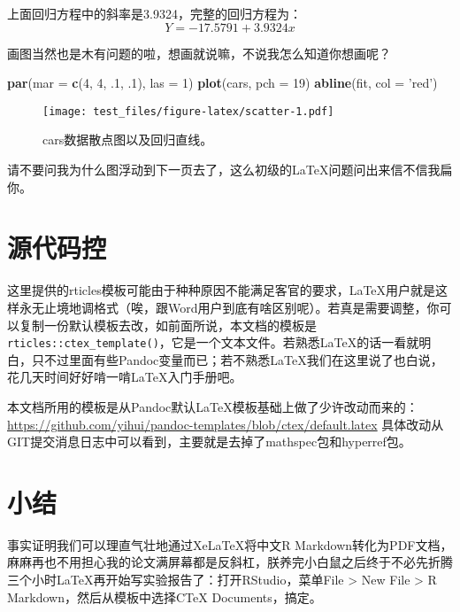 \documentclass[hyperref,]{ctexart}
\newenvironment{Shaded}{\begin{snugshade}}{\end{snugshade}}
\newcommand{\DataTypeTok}[1]{\textcolor[rgb]{0.13,0.29,0.53}{#1}}
\newcommand{\DecValTok}[1]{\textcolor[rgb]{0.00,0.00,0.81}{#1}}
\newcommand{\FloatTok}[1]{\textcolor[rgb]{0.00,0.00,0.81}{#1}}
\newcommand{\KeywordTok}[1]{\textcolor[rgb]{0.13,0.29,0.53}{\textbf{#1}}}
\newcommand{\NormalTok}[1]{#1}
\newcommand{\StringTok}[1]{\textcolor[rgb]{0.31,0.60,0.02}{#1}}
\begin{document}
上面回归方程中的斜率是3.9324，完整的回归方程为：\[ Y = -17.5791 + 3.9324x\]

画图当然也是木有问题的啦，想画就说嘛，不说我怎么知道你想画呢？

\begin{Shaded}
\begin{Highlighting}[]
\KeywordTok{par}\NormalTok{(}\DataTypeTok{mar =} \KeywordTok{c}\NormalTok{(}\DecValTok{4}\NormalTok{, }\DecValTok{4}\NormalTok{, }\FloatTok{.1}\NormalTok{, }\FloatTok{.1}\NormalTok{), }\DataTypeTok{las =} \DecValTok{1}\NormalTok{)}
\KeywordTok{plot}\NormalTok{(cars, }\DataTypeTok{pch =} \DecValTok{19}\NormalTok{)}
\KeywordTok{abline}\NormalTok{(fit, }\DataTypeTok{col =} \StringTok{'red'}\NormalTok{)}
\end{Highlighting}
\end{Shaded}

\begin{figure}
\centering
\texttt{[image: test\_files/figure-latex/scatter-1.pdf]}
\caption{cars数据散点图以及回归直线。}
\end{figure}

请不要问我为什么图浮动到下一页去了，这么初级的LaTeX问题问出来信不信我扁你。

\hypertarget{ux6e90ux4ee3ux7801ux63a7}{%
\section{源代码控}\label{ux6e90ux4ee3ux7801ux63a7}}

这里提供的rticles模板可能由于种种原因不能满足客官的要求，LaTeX用户就是这样永无止境地调格式（唉，跟Word用户到底有啥区别呢）。若真是需要调整，你可以复制一份默认模板去改，如前面所说，本文档的模板是\texttt{rticles::ctex\_template()}，它是一个文本文件。若熟悉LaTeX的话一看就明白，只不过里面有些Pandoc变量而已；若不熟悉LaTeX我们在这里说了也白说，花几天时间好好啃一啃LaTeX入门手册吧。

本文档所用的模板是从Pandoc默认LaTeX模板基础上做了少许改动而来的：\url{https://github.com/yihui/pandoc-templates/blob/ctex/default.latex}
具体改动从GIT提交消息日志中可以看到，主要就是去掉了mathspec包和hyperref包。

\hypertarget{ux5c0fux7ed3}{%
\section{小结}\label{ux5c0fux7ed3}}

事实证明我们可以理直气壮地通过XeLaTeX将中文R
Markdown转化为PDF文档，麻麻再也不用担心我的论文满屏幕都是反斜杠，朕养完小白鼠之后终于不必先折腾三个小时LaTeX再开始写实验报告了：打开RStudio，菜单File
\textgreater{} New File \textgreater{} R Markdown，然后从模板中选择CTeX
Documents，搞定。
\end{document}
